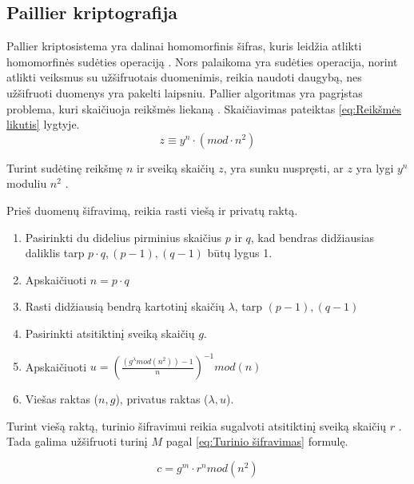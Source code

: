 \documentclass{VUMIFInfBakalaurinis}
\begin{document}
\subsection{Paillier kriptografija}
\par Pallier kriptosistema yra dalinai homomorfinis šifras, kuris leidžia atlikti homomorfinės sudėties operaciją \cite{17}. Nors palaikoma yra sudėties operacija, norint atlikti veiksmus su užšifruotais duomenimis, reikia naudoti daugybą, nes užšifruoti duomenys yra pakelti laipsniu. Pallier algoritmas yra pagrįstas problema, kuri skaičiuoja reikšmės liekaną \cite{17}. Skaičiavimas pateiktas \eqref{eq:Reikšmės likutis} lygtyje.
\begin{equation}
    z \equiv y^{n} \cdot (mod\cdot n^{2})
    \label{eq:Reikšmės liekana}
\end{equation}
\par Turint sudėtinę reikšmę $n$ ir sveiką skaičių $z$, yra sunku nuspręsti, ar $z$ yra lygi $y^{n}$ moduliu $n^{2}$ \cite{17}.
\par Prieš duomenų šifravimą, reikia rasti viešą ir privatų raktą.

\begin{enumerate}
    \item Pasirinkti du didelius pirminius skaičius $p$ ir $q$, kad bendras didžiausias daliklis tarp $p \cdot q, (p - 1), (q - 1)$ būtų lygus 1.
    \item Apskaičiuoti $n = p \cdot q$
    \item Rasti didžiausią bendrą kartotinį skaičių $\lambda$, tarp $(p - 1), (q - 1)$
    \item Pasirinkti atsitiktinį sveiką skaičių $g$.
    \item Apskaičiuoti $u = (\frac{(g^{\lambda} mod (n^2)) - 1}{n})^{-1} mod (n)$
    \item Viešas raktas ($n, g$), privatus raktas ($\lambda, u$).
\end{enumerate}

\par Turint viešą raktą, turinio šifravimui reikia sugalvoti atsitiktinį sveiką skaičių $r$ \cite{17}. Tada galima užšifruoti turinį $M$ pagal \eqref{eq:Turinio šifravimas} formulę.

\begin{equation}
    c = g^{m} \cdot r^{n} mod(n^{2})
    \label{eq:Turinio šifravimas}
\end{equation}
\end{document}
